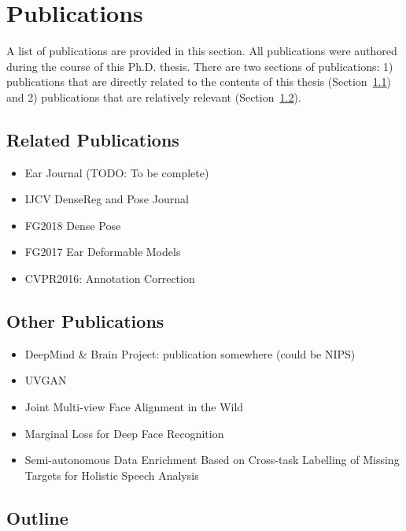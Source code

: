 \section{Publications}
A list of publications are provided in this section. All publications were authored during the course of this Ph.D. thesis. There are two sections of publications: 1) publications that are directly related to the contents of this thesis (Section~\ref{label:related_pubs}) and 2) publications that are relatively relevant (Section~\ref{label:other_pubs}).

\subsection{Related Publications}
\label{label:related_pubs}

\begin{itemize}
  \item Ear Journal (TODO: To be complete)
  \item IJCV DenseReg and Pose Journal
  \item FG2018 Dense Pose
  \item FG2017 Ear Deformable Models
  \item CVPR2016: Annotation Correction
\end{itemize}

\subsection{Other Publications}
\label{label:other_pubs}

\begin{itemize}
  \item DeepMind & Brain Project: publication somewhere (could be NIPS)
  \item UVGAN
  \item Joint Multi-view Face Alignment in the Wild
  \item Marginal Loss for Deep Face Recognition
  \item Semi-autonomous Data Enrichment Based on Cross-task Labelling of Missing Targets for Holistic Speech Analysis
\end{itemize}

\subsection{Outline}



